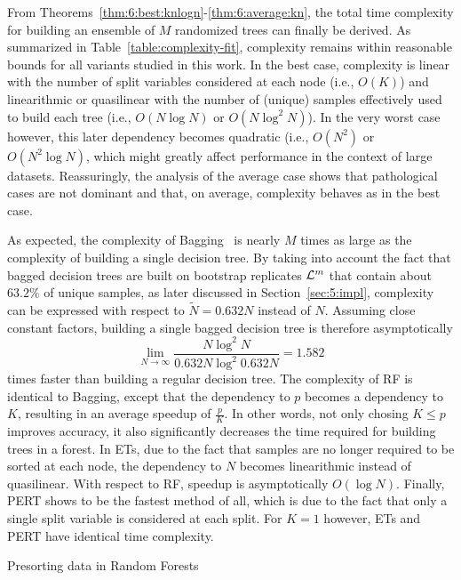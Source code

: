 From Theorems~\ref{thm:6:best:knlogn}-\ref{thm:6:average:kn}, the total time
complexity for building an ensemble of $M$ randomized trees can finally be
derived. As summarized in Table~\ref{table:complexity-fit}, complexity remains
within reasonable bounds for all variants studied in this work. In the best
case, complexity is linear with the number of split variables considered at
each node (i.e., $O(K)$) and linearithmic or quasilinear with the number of
(unique) samples effectively used to build each tree (i.e., $O(N\log N)$ or
$O(N\log^2 N)$). In the very worst case however, this later dependency becomes quadratic
(i.e., $O(N^2)$ or $O(N^2 \log N)$, which might greatly affect performance in
the context of large datasets. Reassuringly, the analysis of the average case
shows that pathological cases are not dominant and that, on average, complexity
behaves as in the best case.

As expected, the complexity of Bagging~\citep{breiman:1996b} is nearly $M$
times as large as the complexity of building a single decision tree. By taking
into account the fact that bagged decision trees are built on bootstrap replicates ${\cal L}^m$ that
contain about $63.2\%$ of unique samples, as later discussed in Section~\ref{sec:5:impl},
complexity can be expressed with respect to $\widetilde{N} = 0.632 N$ instead
of $N$. Assuming close constant factors, building a single bagged decision tree is therefore asymptotically
\begin{equation}
\lim_{N\to \infty} \frac{N\log^2 N}{0.632N \log^2 0.632N} = 1.582
\end{equation}
times faster than building a regular decision tree. The complexity of RF is
identical to Bagging, except that the dependency
to $p$ becomes a dependency to $K$, resulting in an average speedup of
$\tfrac{p}{K}$. In other words, not only chosing $K \leq p$ improves accuracy,
it also significantly decreases the time required for building trees in a
forest. In ETs, due to the fact that
samples are no longer required to be sorted at each node, the dependency to $N$
becomes linearithmic instead of quasilinear. With respect to RF,
speedup is asymptotically $O(\log N)$. Finally, PERT shows to be the fastest
method of all, which is due to the fact that only a single split variable
is considered at each split. For $K=1$ however, ETs and PERT have identical
time complexity.

\begin{remark}{Presorting data in Random Forests}
\end{remark}

